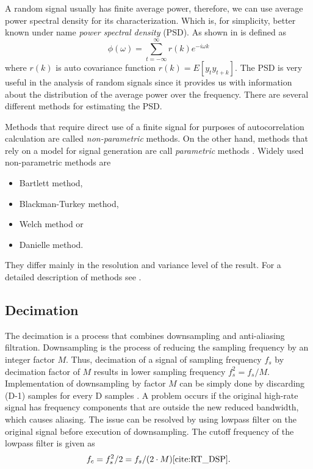 \documentclass[twoside]{ctuthesis}
\theoremstyle{plain}
\theoremstyle{definition}
\theoremstyle{note}
\begin{document}
A random signal usually has finite average power, therefore, we can use average power spectral density for its characterization. Which is, for simplicity, better known under name \textit{power spectral density} (PSD). As shown in \cite{cite:SAoS} is defined as
\begin{equation} \label{eq:PSD1}
	\phi(\omega) = \sum_{t=-\infty}^{\infty}r(k)e^{-i\omega k}
\end{equation}
where $r(k)$ is auto covariance function $r(k) = E[y_{t}y_{t+k}]$.
The PSD is very useful in the analysis of random signals since it provides us with information about the distribution of the average power over the frequency. There are several different methods for estimating the PSD. 

Methods that require direct use of a finite signal for purposes of autocorrelation calculation are called \textit{non-parametric} methods. On the other hand, methods that rely on a model for signal generation are call \textit{parametric} methods \cite{cite:RT_DSP}. Widely used non-parametric methods are

\begin{itemize}
	\setlength{\itemsep}{5pt}
	\item Bartlett method,
	\item Blackman-Turkey method,
	\item Welch method or
	\item Danielle method.
\end{itemize}

They differ mainly in the resolution and variance level of the result. For a detailed description of methods see \cite{cite:2}.

\subsection{Decimation}
\label{sec:decimation}
The decimation is a process that combines downsampling and anti-aliasing filtration. Downsampling is the process of reducing the sampling frequency by an integer factor $M$. Thus, decimation of a signal of sampling frequency $f_s$ by decimation factor of $M$ results in lower sampling frequency ${f_s^{2}=f_s/M}$. Implementation of downsampling by factor $M$ can be simply done by discarding (D-1) samples for every D samples \cite{cite:2}. 
A problem occurs if the original high-rate signal has frequency components that are outside the new reduced bandwidth, which causes aliasing. The issue can be resolved by using lowpass filter on the original signal before execution of downsampling. The cutoff frequency of the lowpass filter is given as
\begin{equation} \label{eq:decimation}
	f_c=f_s^{2}/2=f_s/(2\cdot M) \cite{cite:RT_DSP}.
\end{equation}
\end{document}
